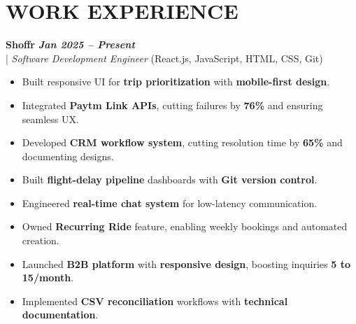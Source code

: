 \documentclass[10pt,a4paper]{article}
\begin{document}
\section*{WORK EXPERIENCE}
\small

\noindent
  \textbf{Shoffr} \hfill \textit{\textbf{Jan 2025 -- Present}} \\
  \;|\;
  \textit{Software Development Engineer} (React.js, JavaScript, HTML, CSS, Git)
\begin{itemize}



\item Built responsive UI for \textbf{trip prioritization} with \textbf{mobile-first design}.



\item Integrated \textbf{Paytm Link APIs}, cutting failures by \textbf{76\%} and ensuring seamless UX.



\item Developed \textbf{CRM workflow system}, cutting resolution time by \textbf{65\%} and documenting designs.



\item Built \textbf{flight-delay pipeline} dashboards with \textbf{Git version control}.



\item Engineered \textbf{real-time chat system} for low-latency communication.



\item Owned \textbf{Recurring Ride} feature, enabling weekly bookings and automated creation.



\item Launched \textbf{B2B platform} with \textbf{responsive design}, boosting inquiries \textbf{5 to 15/month}.



\item Implemented \textbf{CSV reconciliation} workflows with \textbf{technical documentation}.



\end{itemize}
\end{document}
